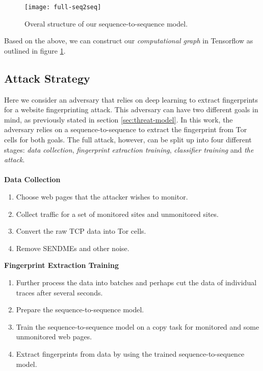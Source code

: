 \begin{figure}[ht]
  \centering
  \texttt{[image: full-seq2seq]}
  \caption{Overal structure of our sequence-to-sequence model.}
  \label{fig:full-seq2seq}
\end{figure}

Based on the above, we can construct our \textit{computational graph} in Tensorflow as outlined in figure \ref{fig:full-seq2seq}.

\newpage

\subsection{Attack Strategy}

Here we consider an adversary that relies on deep learning to extract fingerprints for a website fingerprinting attack.
This adversary can have two different goals in mind, as previously stated in section \ref{sec:threat-model}.
In this work, the adversary relies on a sequence-to-sequence to extract the fingerprint from Tor cells for both goals.
The full attack, however, can be split up into four different stages: \textit{data collection}, \textit{fingerprint extraction training}, \textit{classifier training} and \textit{the attack}.
\\\\
\noindent
\textbf{Data Collection}
\begin{enumerate}
  \item Choose web pages that the attacker wishes to monitor.
  \item Collect traffic for a set of monitored sites and unmonitored sites.
  \item Convert the raw TCP data into Tor cells.
  \item Remove SENDMEs and other noise.
\end{enumerate}

\noindent
\textbf{Fingerprint Extraction Training}
\begin{enumerate}[resume]
  \item Further process the data into batches and perhaps cut the data of individual traces after several seconds.
  \item Prepare the sequence-to-sequence model.
  \item Train the sequence-to-sequence model on a copy task for monitored and some unmonitored web pages.
  \item Extract fingerprints from data by using the trained sequence-to-sequence model.
\end{enumerate}

